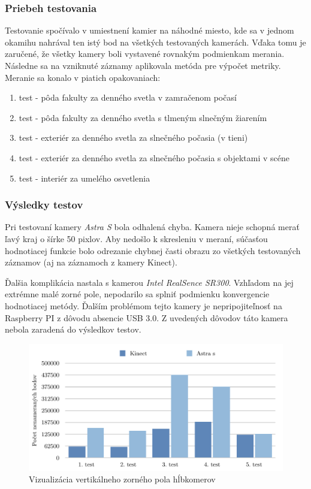 \subsubsection{Priebeh testovania}
Testovanie spočívalo v umiestnení kamier na náhodné miesto, kde sa v jednom okamihu nahrával ten istý bod na všetkých testovaných kamerách. Vďaka tomu je zaručené, že všetky kamery boli vystavené rovnakým podmienkam merania. Následne sa na vzniknuté záznamy aplikovala metóda pre výpočet metriky. Meranie sa konalo v piatich opakovaniach: 

\begin{enumerate}
\item test - pôda fakulty za denného svetla v zamračenom počasí
\item test - pôda fakulty za denného svetla s tlmeným slnečným žiarením
\item test - exteriér za denného svetla za slnečného počasia (v tieni)
\item test - exteriér za denného svetla za slnečného počasia s objektami v scéne
\item test - interiér za umelého osvetlenia
\end{enumerate}

\subsubsection{Výsledky testov}
Pri testovaní kamery \textit{Astra S} bola odhalená chyba. Kamera nieje schopná merať ľavý kraj o šírke 50 pixlov. Aby nedošlo k skresleniu v meraní, súčasťou hodnotiacej funkcie bolo odrezanie chybnej časti obrazu zo všetkých testovaných záznamov (aj na záznamoch z kamery Kinect). 

Ďalšia komplikácia nastala s kamerou \textit{Intel RealSence SR300}. Vzhľadom na jej extrémne malé zorné pole, nepodarilo sa splniť podmienku konvergencie hodnotiacej metódy. Ďalším problémom tejto kamery je nepripojiteľnosť na Raspberry PI z dôvodu absencie USB 3.0. Z uvedených dôvodov táto kamera nebola zaradená do výsledkov testov.  


\begin{figure}[H]
\begin{center}
	\includegraphics[scale=0.7]{images/noiseGraph}
	\caption{Vizualizácia vertikálneho zorného pola hĺbkomerov}
	\end{center}
\end{figure}

